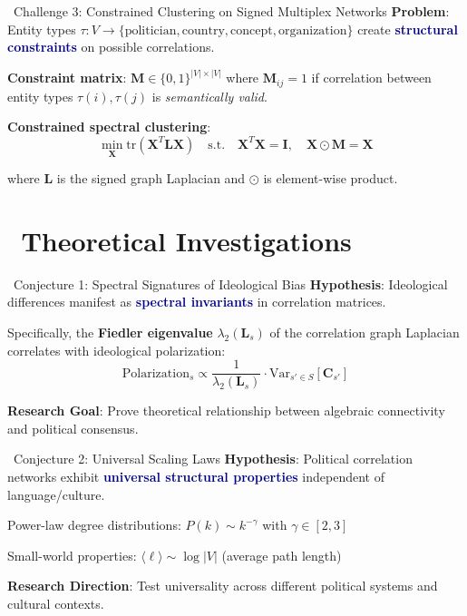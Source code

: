 \documentclass[11pt]{article}
\newcommand{\highlight}[1]{\textcolor{darkblue}{\textbf{#1}}}
\begin{document}
\begin{challengebox}{\faNetworkWired \, Challenge 3: Constrained Clustering on Signed Multiplex Networks}
\textbf{Problem}: Entity types $\tau: V \to \{\text{politician}, \text{country}, \text{concept}, \text{organization}\}$ create \highlight{structural constraints} on possible correlations.

\textbf{Constraint matrix}: $\mathbf{M} \in \{0,1\}^{|V| \times |V|}$ where $\mathbf{M}_{ij} = 1$ if correlation between entity types $\tau(i), \tau(j)$ is \textit{semantically valid}.

\textbf{Constrained spectral clustering}:
$$\min_{\mathbf{X}} \text{tr}(\mathbf{X}^T \mathbf{L} \mathbf{X}) \quad \text{s.t.} \quad \mathbf{X}^T\mathbf{X} = \mathbf{I}, \quad \mathbf{X} \odot \mathbf{M} = \mathbf{X}$$

where $\mathbf{L}$ is the signed graph Laplacian and $\odot$ is element-wise product.
\end{challengebox}

\section{\faFlask \, Theoretical Investigations}

\begin{theorembox}{\faTheoryTitle \, Conjecture 1: Spectral Signatures of Ideological Bias}
\textbf{Hypothesis}: Ideological differences manifest as \highlight{spectral invariants} in correlation matrices.

Specifically, the \textbf{Fiedler eigenvalue} $\lambda_2(\mathbf{L}_s)$ of the correlation graph Laplacian correlates with ideological polarization:
$$\text{Polarization}_s \propto \frac{1}{\lambda_2(\mathbf{L}_s)} \cdot \text{Var}_{s' \in S}[\mathbf{C}_{s'}]$$

\textbf{Research Goal}: Prove theoretical relationship between algebraic connectivity and political consensus.
\end{theorembox}

\begin{theorembox}{\faInfinity \, Conjecture 2: Universal Scaling Laws}
\textbf{Hypothesis}: Political correlation networks exhibit \highlight{universal structural properties} independent of language/culture.

Power-law degree distributions: $P(k) \sim k^{-\gamma}$ with $\gamma \in [2, 3]$

Small-world properties: $\langle \ell \rangle \sim \log |V|$ (average path length)

\textbf{Research Direction}: Test universality across different political systems and cultural contexts.
\end{theorembox}
\end{document}
